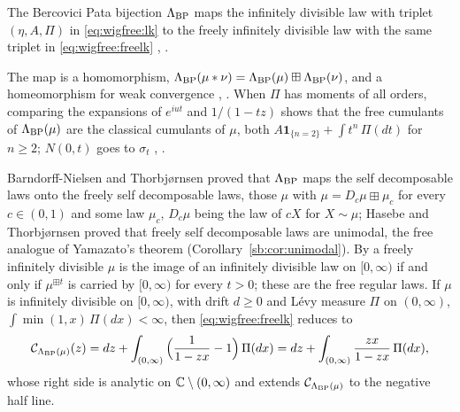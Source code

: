 \begin{definition}\label{def:wigfree:bp}
The Bercovici Pata bijection $\Lambda_{\rm BP}$ maps the infinitely divisible law with triplet $(\eta,A,\Pi)$ in \eqref{eq:wigfree:lk} to the freely infinitely divisible law with the same triplet in \eqref{eq:wigfree:freelk} \cite{BP99}, \cite[Definition 7]{AHS13}.
\end{definition}

The map is a homomorphism, $\Lambda_{\rm BP}(\mu*\nu)=\Lambda_{\rm BP}(\mu)\boxplus\Lambda_{\rm BP}(\nu)$, and a homeomorphism for weak convergence \cite{BP99}, \cite[Section 3.2]{AHS13}. When $\Pi$ has moments of all orders, comparing the expansions of $e^{iut}$ and $1/(1-tz)$ shows that the free cumulants of $\Lambda_{\rm BP}(\mu)$ are the classical cumulants of $\mu$, both $A\mathbf 1_{\{n=2\}}+\int t^n\,\Pi(dt)$ for $n\ge2$; $N(0,t)$ goes to $\sigma_t$ \cite{BP99}, \cite[Section 3.2 and Remark 8]{AHS13}.

Barndorff-Nielsen and Thorbj{\o}rnsen \cite{BNT02} proved that $\Lambda_{\rm BP}$ maps the self decomposable laws onto the freely self decomposable laws, those $\mu$ with $\mu=D_c\mu\boxplus\mu_c$ for every $c\in(0,1)$ and some law $\mu_c$, $D_c\mu$ being the law of $cX$ for $X\sim\mu$; Hasebe and Thorbj{\o}rnsen \cite{HT16} proved that freely self decomposable laws are unimodal, the free analogue of Yamazato's theorem (Corollary~\ref{sb:cor:unimodal}). By \cite[Theorem 9]{AHS13} a freely infinitely divisible $\mu$ is the image of an infinitely divisible law on $[0,\infty)$ if and only if $\mu^{\boxplus t}$ is carried by $[0,\infty)$ for every $t>0$; these are the free regular laws. If $\mu$ is infinitely divisible on $[0,\infty)$, with drift $d\ge0$ and L\'evy measure $\Pi$ on $(0,\infty)$, $\int\min(1,x)\,\Pi(dx)<\infty$, then \eqref{eq:wigfree:freelk} reduces to \cite[(7)]{AHS13}
\begin{equation}\label{eq:wigfree:freereg}
\mathcal C_{\Lambda_{\rm BP}(\mu)}(z)=dz+\int_{(0,\infty)}\Big(\frac1{1-zx}-1\Big)\,\Pi(dx)=dz+\int_{(0,\infty)}\frac{zx}{1-zx}\,\Pi(dx),
\end{equation}
whose right side is analytic on $\mathbb{C}\setminus(0,\infty)$ and extends $\mathcal C_{\Lambda_{\rm BP}(\mu)}$ to the negative half line.

